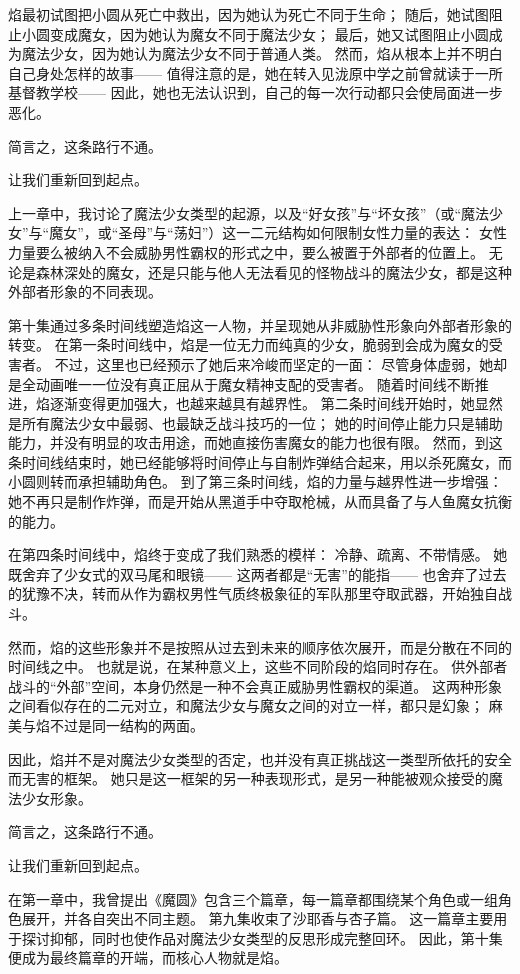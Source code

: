 焰最初试图把小圆从死亡中救出，因为她认为死亡不同于生命；
随后，她试图阻止小圆变成魔女，因为她认为魔女不同于魔法少女；
最后，她又试图阻止小圆成为魔法少女，因为她认为魔法少女不同于普通人类。
然而，焰从根本上并不明白自己身处怎样的故事——
值得注意的是，她在转入见泷原中学之前曾就读于一所基督教学校——
因此，她也无法认识到，自己的每一次行动都只会使局面进一步恶化。

简言之，这条路行不通。

让我们重新回到起点。

上一章中，我讨论了魔法少女类型的起源，以及“好女孩”与“坏女孩”（或“魔法少女”与“魔女”，或“圣母”与“荡妇”）这一二元结构如何限制女性力量的表达：
女性力量要么被纳入不会威胁男性霸权的形式之中，要么被置于外部者的位置上。
无论是森林深处的魔女，还是只能与他人无法看见的怪物战斗的魔法少女，都是这种外部者形象的不同表现。

第十集通过多条时间线塑造焰这一人物，并呈现她从非威胁性形象向外部者形象的转变。
在第一条时间线中，焰是一位无力而纯真的少女，脆弱到会成为魔女的受害者。
不过，这里也已经预示了她后来冷峻而坚定的一面：
尽管身体虚弱，她却是全动画唯一一位没有真正屈从于魔女精神支配的受害者。
随着时间线不断推进，焰逐渐变得更加强大，也越来越具有越界性。
第二条时间线开始时，她显然是所有魔法少女中最弱、也最缺乏战斗技巧的一位；
她的时间停止能力只是辅助能力，并没有明显的攻击用途，而她直接伤害魔女的能力也很有限。
然而，到这条时间线结束时，她已经能够将时间停止与自制炸弹结合起来，用以杀死魔女，而小圆则转而承担辅助角色。
到了第三条时间线，焰的力量与越界性进一步增强：
她不再只是制作炸弹，而是开始从黑道手中夺取枪械，从而具备了与人鱼魔女抗衡的能力。

在第四条时间线中，焰终于变成了我们熟悉的模样：
冷静、疏离、不带情感。
她既舍弃了少女式的双马尾和眼镜——
这两者都是“无害”的能指——
也舍弃了过去的犹豫不决，转而从作为霸权男性气质终极象征的军队那里夺取武器，开始独自战斗。

然而，焰的这些形象并不是按照从过去到未来的顺序依次展开，而是分散在不同的时间线之中。
也就是说，在某种意义上，这些不同阶段的焰同时存在。
供外部者战斗的“外部”空间，本身仍然是一种不会真正威胁男性霸权的渠道。
这两种形象之间看似存在的二元对立，和魔法少女与魔女之间的对立一样，都只是幻象；
麻美与焰不过是同一结构的两面。

因此，焰并不是对魔法少女类型的否定，也并没有真正挑战这一类型所依托的安全而无害的框架。
她只是这一框架的另一种表现形式，是另一种能被观众接受的魔法少女形象。

简言之，这条路行不通。

让我们重新回到起点。

在第一章中，我曾提出《魔圆》包含三个篇章，每一篇章都围绕某个角色或一组角色展开，并各自突出不同主题。
第九集收束了沙耶香与杏子篇。
这一篇章主要用于探讨抑郁，同时也使作品对魔法少女类型的反思形成完整回环。
因此，第十集便成为最终篇章的开端，而核心人物就是焰。

